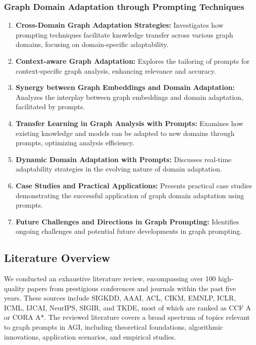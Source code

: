 \subsubsection{Graph Domain Adaptation through Prompting Techniques}
\begin{enumerate}
    \item \textbf{Cross-Domain Graph Adaptation Strategies:} Investigates how prompting techniques facilitate knowledge transfer across various graph domains, focusing on domain-specific adaptability.
    \item \textbf{Context-aware Graph Adaptation:} Explores the tailoring of prompts for context-specific graph analysis, enhancing relevance and accuracy.
    \item \textbf{Synergy between Graph Embeddings and Domain Adaptation:} Analyzes the interplay between graph embeddings and domain adaptation, facilitated by prompts.
    \item \textbf{Transfer Learning in Graph Analysis with Prompts:} Examines how existing knowledge and models can be adapted to new domains through prompts, optimizing analysis efficiency.
    \item \textbf{Dynamic Domain Adaptation with Prompts:} Discusses real-time adaptability strategies in the evolving nature of domain adaptation.
    \item \textbf{Case Studies and Practical Applications:} Presents practical case studies demonstrating the successful application of graph domain adaptation using prompts.
    \item \textbf{Future Challenges and Directions in Graph Prompting:} Identifies ongoing challenges and potential future developments in graph prompting.
\end{enumerate}

\subsection{Literature Overview}

We conducted an exhaustive literature review, encompassing over 100 high-quality papers from prestigious conferences and journals within the past five years. These sources include SIGKDD, AAAI, ACL, CIKM, EMNLP, ICLR, ICML, IJCAI, NeurIPS, SIGIR, and TKDE, most of which are ranked as CCF A or CORA A*. The reviewed literature covers a broad spectrum of topics relevant to graph prompts in AGI, including theoretical foundations, algorithmic innovations, application scenarios, and empirical studies.

